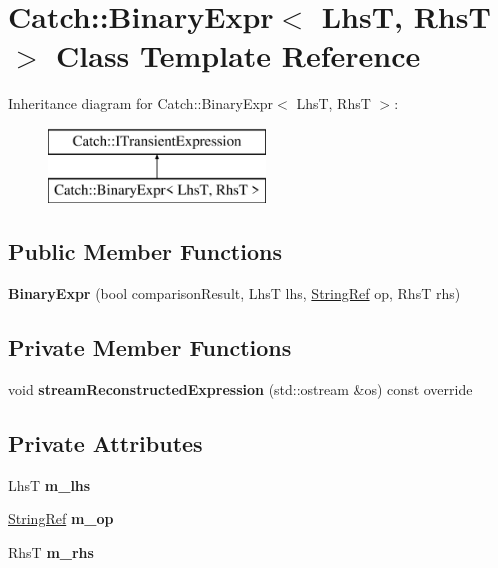 \hypertarget{class_catch_1_1_binary_expr}{}\section{Catch\+:\+:Binary\+Expr$<$ LhsT, RhsT $>$ Class Template Reference}
\label{class_catch_1_1_binary_expr}
Inheritance diagram for Catch\+:\+:Binary\+Expr$<$ LhsT, RhsT $>$\+:\begin{figure}[H]
\begin{center}
\leavevmode
\includegraphics[height=2.000000cm]{class_catch_1_1_binary_expr}
\end{center}
\end{figure}
\subsection*{Public Member Functions}
\begin{DoxyCompactItemize}
\item 
\mbox{\label{class_catch_1_1_binary_expr_a657d66346aef97a760c22776fe6008b6}} 
{\bfseries Binary\+Expr} (bool comparison\+Result, LhsT lhs, \mbox{\hyperlink{class_catch_1_1_string_ref}{String\+Ref}} op, RhsT rhs)
\end{DoxyCompactItemize}
\subsection*{Private Member Functions}
\begin{DoxyCompactItemize}
\item 
\mbox{\label{class_catch_1_1_binary_expr_af998022712d4bd3e4fc7ab9b8a38b445}} 
void {\bfseries stream\+Reconstructed\+Expression} (std\+::ostream \&os) const override
\end{DoxyCompactItemize}
\subsection*{Private Attributes}
\begin{DoxyCompactItemize}
\item 
\mbox{\label{class_catch_1_1_binary_expr_a306b29e77b48f9c538c5031a59adc4ce}} 
LhsT {\bfseries m\+\_\+lhs}
\item 
\mbox{\label{class_catch_1_1_binary_expr_ab21dea40c53fd64d4f7a073dbe93ec95}} 
\mbox{\hyperlink{class_catch_1_1_string_ref}{String\+Ref}} {\bfseries m\+\_\+op}
\item 
\mbox{\label{class_catch_1_1_binary_expr_a54cb1629bf304ebe0c1560f4cc2bc186}} 
RhsT {\bfseries m\+\_\+rhs}
\end{DoxyCompactItemize}
